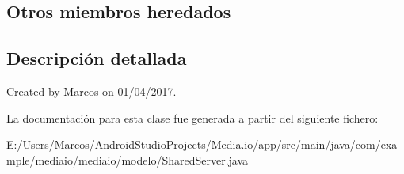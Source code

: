 \subsection*{Otros miembros heredados}


\subsection{Descripción detallada}
Created by Marcos on 01/04/2017. 

La documentación para esta clase fue generada a partir del siguiente fichero\+:\begin{DoxyCompactItemize}
\item 
E\+:/\+Users/\+Marcos/\+Android\+Studio\+Projects/\+Media.\+io/app/src/main/java/com/example/mediaio/mediaio/modelo/Shared\+Server.\+java\end{DoxyCompactItemize}
